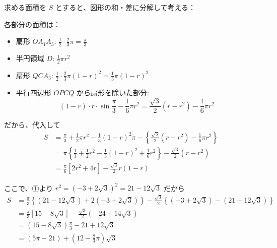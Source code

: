 \documentclass[../main.tex]{subfiles}
\begin{document}
求める面積を $S$ とすると、図形の和・差に分解して考える：

\begin{center}
\end{center}

各部分の面積は：
\begin{itemize}
  \item 扇形 $OA_1A_3$: $\frac{1}{2} \cdot \frac{2}{3}\pi = \frac{\pi}{3}$
  \item 半円領域 $D$: $\frac{1}{2}\pi r^2$
  \item 扇形 $Q C A_3$: $\frac{1}{2} \cdot \frac{2}{3}\pi (1-r)^2 = \frac{1}{3}\pi (1-r)^2$
  \item 平行四辺形 $OPCQ$ から扇形を除いた部分:
    \[
      (1-r) \cdot r \cdot \sin \frac{\pi}{3} - \frac{1}{6}\pi r^2 = \frac{\sqrt{3}}{2}(r - r^2) - \frac{1}{6}\pi r^2
    \]
\end{itemize}

だから、代入して
\begin{align*}
  S &= \frac{\pi}{3} + \frac{1}{2}\pi r^2 - \frac{1}{3}(1-r)^2\pi - \left\{ \frac{\sqrt{3}}{2}(r-r^2) - \frac{1}{6}\pi r^2 \right\} \\
  &= \pi \left\{ \frac{1}{3} + \frac{1}{2}r^2 - \frac{1}{3}(1-r)^2 + \frac{1}{6}r^2 \right\} - \frac{\sqrt{3}}{2}(r-r^2) \\
  &= \frac{\pi}{6} \left[ 2r^2 + 4r \right] - \frac{\sqrt{3}}{2} r (1-r)
\end{align*}

ここで、①より $r^2 = (-3+2\sqrt{3})^2 = 21 - 12\sqrt{3}$ だから
\begin{align*}
  S &= \frac{\pi}{3} \left\{ (21 - 12\sqrt{3}) + 2(-3 + 2\sqrt{3}) \right\} - \frac{\sqrt{3}}{2} \left\{ (-3 + 2\sqrt{3}) - (21 - 12\sqrt{3}) \right\} \\
  &= \frac{\pi}{3} \left[ 15 - 8\sqrt{3} \right] - \frac{\sqrt{3}}{2} \left( -24 + 14\sqrt{3} \right) \\
  &= (15 - 8\sqrt{3})\frac{\pi}{3} - 21 + 12\sqrt{3} \\
  &= (5\pi - 21) + \left( 12 - \frac{8}{3}\pi \right)\sqrt{3}
\end{align*}
\end{document}
